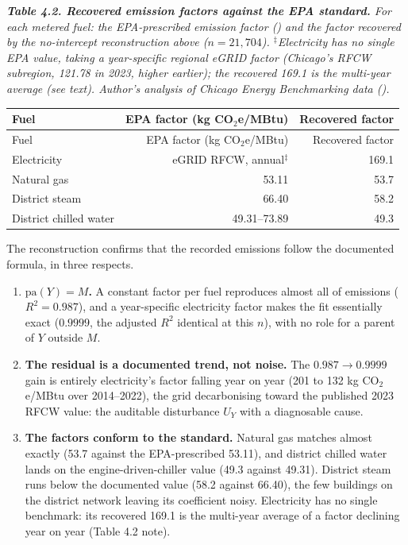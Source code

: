 \par\medskip\noindent
{\small\itshape \textbf{Table 4.2. Recovered emission factors against the EPA standard.} For each metered fuel: the EPA-prescribed emission factor () and the factor recovered by the no-intercept reconstruction above ($n = 21{,}704$). $^\ddagger$Electricity has no single EPA value, taking a year-specific regional eGRID factor (Chicago's RFCW subregion, 121.78 in 2023, higher earlier); the recovered 169.1 is the multi-year average (see text). Author's analysis of Chicago Energy Benchmarking data ().\par}
\nopagebreak\medskip\nopagebreak
{
\setlength{\tabcolsep}{7pt}
\renewcommand{\arraystretch}{1.15}
\begin{longtable}{lrr}
\toprule
Fuel & EPA factor (kg CO$_2$e/MBtu) & Recovered factor \\
\midrule
\endfirsthead
\toprule
Fuel & EPA factor (kg CO$_2$e/MBtu) & Recovered factor \\
\midrule
\endhead
\bottomrule
\endlastfoot
Electricity & eGRID RFCW, annual$^\ddagger$ & 169.1 \\
Natural gas & 53.11 & 53.7 \\
District steam & 66.40 & 58.2 \\
District chilled water & 49.31--73.89 & 49.3 \\
\end{longtable}
}
\par\medskip

The reconstruction confirms that the recorded emissions follow the documented formula, in three respects.

\begin{enumerate}
  \item \textbf{$\mathrm{pa}(Y) = M$.} A constant factor per fuel reproduces almost all of emissions ($R^2 = 0.987$), and a year-specific electricity factor makes the fit essentially exact ($0.9999$, the adjusted $R^2$ identical at this $n$), with no role for a parent of $Y$ outside $M$.
  \item \textbf{The residual is a documented trend, not noise.} The $0.987 \to 0.9999$ gain is entirely electricity's factor falling year on year (201 to 132 kg CO$_2$e/MBtu over 2014--2022), the grid decarbonising toward the published 2023 RFCW value: the auditable disturbance $U_Y$ with a diagnosable cause.
  \item \textbf{The factors conform to the standard.} Natural gas matches almost exactly (53.7 against the EPA-prescribed 53.11), and district chilled water lands on the engine-driven-chiller value (49.3 against 49.31). District steam runs below the documented value (58.2 against 66.40), the few buildings on the district network leaving its coefficient noisy. Electricity has no single benchmark: its recovered 169.1 is the multi-year average of a factor declining year on year (Table 4.2 note).
\end{enumerate}

